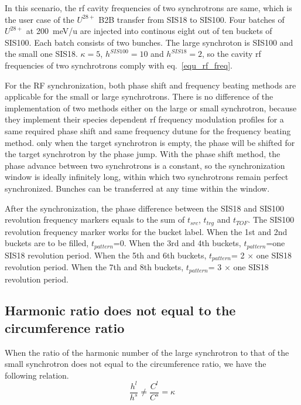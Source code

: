In this scenario, the rf cavity frequencies of two synchrotrons are same, which is the user case of the $U^{28+}$ B2B transfer from SIS18 to SIS100. Four batches of $U^{28+}$ at \SI{200}{meV/\atomicmassunit} are injected into continous eight out of ten buckets of SIS100. Each batch consists of two bunches. The large synchroton is SIS100 and the small one SIS18. $\kappa=5$, $h^{SIS100}=10$ and $h^{SIS18}=2$, so the cavity rf frequencies of two synchrotrons comply with eq.~\ref{equ_rf_freq}.

For the RF synchronization, both phase shift and frequency beating methods are applicable for the small or large synchrotrons. There is no difference of the implementation of two methods either on the large or small synchrotron, because they implement their species dependent rf frequency modulation profiles for a same required phase shift and same frequency dutune for the frequency beating method. only when the target synchrotron is empty, the phase will be shifted for the target synchrotron by the phase jump. With the phase shift method, the phase advance between two synchrotrons is a constant, so the synchronization window is ideally infinitely long, within which two synchrotrons remain perfect synchronized. Bunches can be transferred at any time within the window.  

After the synchronization, the phase difference between the SIS18 and SIS100 revolution frequency markers equals to the sum of $t_{src}$, $t_{trg}$ and $t_{TOF}$. The SIS100 revolution frequency marker works for the bucket label. When the 1st and 2nd buckets are to be filled, $t_{pattern}$=0. When the 3rd and 4th buckets, $t_{pattern}$=one SIS18 revolution period. When the 5th and 6th buckets, $t_{pattern}$= 2 $\times$ one SIS18 revolution period. When the 7th and 8th buckets, $t_{pattern}$= 3 $\times$ one SIS18 revolution period. 

\subsection{Harmonic ratio does not equal to the circumference ratio} 
When the ratio of the harmonic number of the large synchrotron to that of the small synchrotron does not equal to the circumference ratio, we have the following relation.
\begin{equation}
\frac {h^{l}}{h^{s}}\neq \frac {C^{l}}{C^{s}}= \kappa  \label{harmonic_1_noint}
\end{equation}

